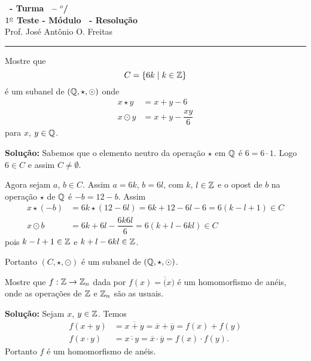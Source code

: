 \documentclass[12pt]{exam}
\begin{document}
\begin{center}
{\Large\bf \disciplina\ - Turma \turma\ -- \semestre$^{o}$/\ano} \\ \vspace{9pt} {\large\bf
$1^{\underline{o}}$ Teste - M\'odulo \modulo\ - Resolu\c{c}\~ao}\\
\vspace{9pt} Prof. Jos{\'e} Ant{\^o}nio O. Freitas
\end{center}
\hrule

\vspace{.6cm}

\questao{} Mostre que
\[
	C = \{6k \mid k \in \mathbb{Z}\}
\]
é um subanel de $(\mathbb{Q}, \star, \odot)$ onde
\begin{align*}
	x \star y &= x + y - 6\\
	x \odot y &= x + y - \dfrac{xy}{6}
\end{align*}
para $x$, $y \in \mathbb{Q}$.

\noindent\textbf{Solu\c{c}\~ao:} Sabemos que o elemento neutro da operação $\star$ em $\mathbb{Q}$ é $6 = 6\cdot 1$. Logo $6 \in C$ e assim $C \neq \emptyset$.

Agora sejam $a$, $b \in C$. Assim $a = 6k$, $b = 6l$, com $k$, $l \in \mathbb{Z}$ e o opost de $b$ na operação $\star$ de $\mathbb{Q}$ é $-b = 12 - b$. Assim
\begin{align*}
	x \star (-b) &= 6k \star (12 - 6l) = 6k + 12 - 6l - 6 = 6(k - l + 1) \in C\\
	x \odot b &= 6k + 6l - \dfrac{6k6l}{6} = 6(k + l - 6kl) \in C
\end{align*}
pois $k - l + 1 \in \mathbb{Z}$ e $k + l - 6kl \in \mathbb{Z}$.

Portanto $(C, \star, \odot)$ é um subanel de $(\mathbb{Q}, \star, \odot)$.

\vspace{.3cm}

\questao{} Mostre que $f : \mathbb{Z} \to \mathbb{Z}_n$ dada por $f(x) = \overline(x)$ é um homomorfismo de anéis, onde as operações de $\mathbb{Z}$ e $\mathbb{Z}_n$ são as usuais.

\noindent\textbf{Solu\c{c}\~ao:} Sejam $x$, $y \in \mathbb{Z}$. Temos
\begin{align*}
	f(x + y) &= \overline{x + y} = \overline{x} + \overline{y} = f(x) + f(y)\\
	f(x\cdot y) &= \overline{x\cdot y} = \overline{x}\cdot\overline{y} = f(x)\cdot f(y).
\end{align*}
Portanto $f$ é um homomorfismo de anéis.
\end{document}
